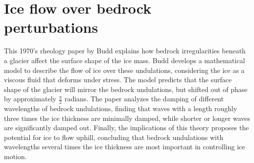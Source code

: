 \section{Ice flow over bedrock perturbations}
This 1970's rheology paper by Budd explains how bedrock irregularities beneath a glacier affect the surface shape of the ice mass. Budd develops a mathematical model to describe the flow of ice over these undulations, considering the ice as a viscous fluid that deforms under stress. The model predicts that the surface shape of the glacier will mirror the bedrock undulations, but shifted out of phase by approximately $\frac{\pi}{2}$ radians. The paper analyzes the damping of different wavelengths of bedrock undulations, finding that waves with a length roughly three times the ice thickness are minimally damped, while shorter or longer waves are significantly damped out. Finally, the implications of this theory proposes the potential for ice to flow uphill, concluding that bedrock undulations with wavelengths several times the ice thickness are most important in controlling ice motion.







